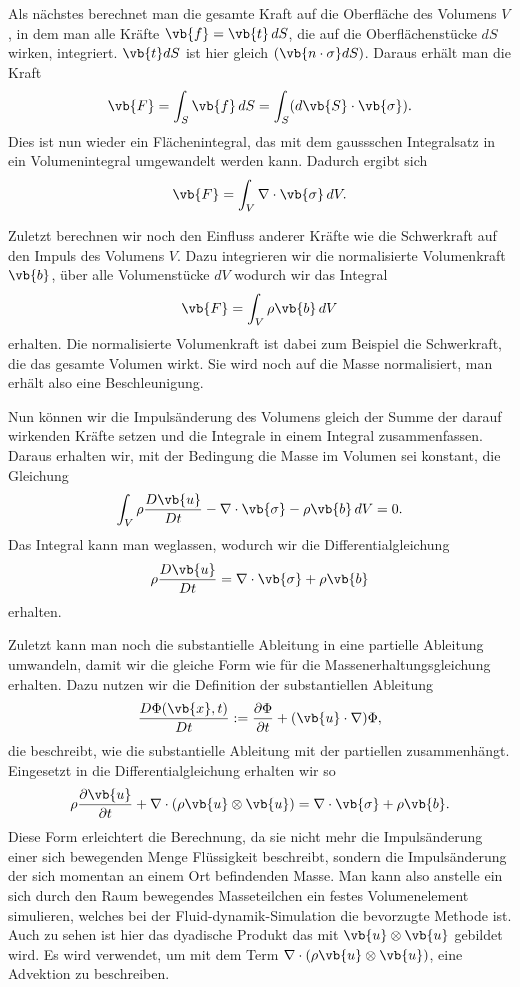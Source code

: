 Als nächstes berechnet man die gesamte Kraft auf die Oberfläche des Volumens $V$, in dem man alle Kräfte $\vb{f} = \vb{t}\,dS$, die auf die Oberflächenstücke $dS$ wirken, integriert.
$\vb{t} dS$ ist hier gleich $(\vb{n\cdot\sigma}dS)$. 
Daraus erhält man die Kraft 
\[\vb{F} 
=
\int_{S}\vb{f}\, dS
= \int_{S} (d\vb{S}\cdot\vb{\sigma})
.\]
Dies ist nun wieder ein Flächenintegral, das mit dem gaussschen Integralsatz in ein Volumenintegral umgewandelt werden kann.
Dadurch ergibt sich
\[\vb{F} 
=
\int_{V}\nabla \cdot \vb{\sigma}\, dV
.\]

Zuletzt berechnen wir noch den Einfluss anderer Kräfte wie die Schwerkraft auf den Impuls des Volumens $V$.
Dazu integrieren wir die normalisierte Volumenkraft $\vb{b}$, über alle Volumenstücke $dV$ wodurch wir das Integral 
\[\vb{F} 
=
\int_{V}\rho\vb{b}\, dV
\]
erhalten.
Die normalisierte Volumenkraft ist dabei zum Beispiel die Schwerkraft, die das gesamte Volumen wirkt. 
Sie wird noch auf die Masse normalisiert, man erhält also eine Beschleunigung.

Nun können wir die Impulsänderung des Volumens gleich der Summe der darauf wirkenden Kräfte setzen und die Integrale in einem Integral zusammenfassen. Daraus erhalten wir, mit der Bedingung die Masse im Volumen sei konstant, die Gleichung 
\[\int_{V} \rho \frac{D\vb{u}}{Dt} - \nabla \cdot \vb{\sigma} -\rho \vb{b}\, dV
=
0.
\]
Das Integral kann man weglassen, wodurch wir die Differentialgleichung
\begin{equation}
\label{openfoam:euler2_1}
\rho \frac{D\vb{u}}{Dt}
= 
\nabla \cdot \vb{\sigma} +\rho \vb{b}
\end{equation}
erhalten.

Zuletzt kann man noch die substantielle Ableitung in eine partielle Ableitung umwandeln, damit wir die gleiche Form wie für die Massenerhaltungsgleichung erhalten.
Dazu nutzen wir die Definition der substantiellen Ableitung
\[
\frac{D\Phi(\vb{x},t)}{Dt}
:=
\frac{\partial \Phi}{\partial t}+(\vb{u}\cdot \nabla)\Phi
,\] 
die beschreibt, wie die substantielle Ableitung mit der partiellen zusammenhängt.
Eingesetzt in die Differentialgleichung erhalten wir so 
\begin{equation}
\label{openfoam:euler2}
\rho\frac{\partial\vb{u}}{\partial t} + \nabla \cdot(\rho\vb{u}\otimes \vb{u})
= 
\nabla \cdot \vb{\sigma} +\rho \vb{b}.
\end{equation}
Diese Form erleichtert die Berechnung, da sie nicht mehr die Impulsänderung einer sich bewegenden Menge Flüssigkeit beschreibt, sondern die Impulsänderung der sich momentan an einem Ort befindenden Masse. 
Man kann also anstelle ein sich durch den Raum bewegendes Masseteilchen ein festes Volumenelement simulieren, welches bei der Fluid-dynamik-Simulation die bevorzugte Methode ist.
Auch zu sehen ist hier das dyadische Produkt das mit $\vb{u}\otimes \vb{u}$ gebildet wird.
Es wird verwendet, um mit dem Term $\nabla \cdot(\rho\vb{u}\otimes \vb{u})$, eine Advektion zu beschreiben.

